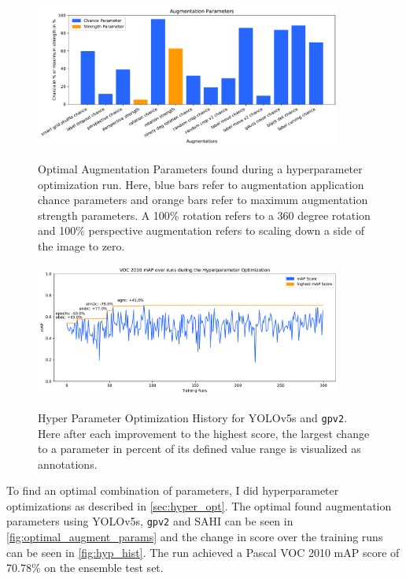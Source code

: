 \documentclass[10pt]{book}
\newcommand{\figureref}[1]{\autoref{#1}}
\begin{document}
\begin{figure}
  \caption{Optimal Augmentation Parameters found during a hyperparameter optimization run. Here, blue bars refer to augmentation application chance parameters and orange bars refer to maximum augmentation strength parameters. A 100\% rotation refers to a 360 degree rotation and 100\% perspective augmentation refers to scaling down a side of the image to zero.}
  \includegraphics[width=0.9\textwidth]{plot/best_hyp_run_params}
  \label{fig:optimal_augment_params} 
\end{figure} %

\begin{figure}
  \caption{Hyper Parameter Optimization History for \ac{YOLO}v5s and \texttt{gpv2}. Here after each improvement to the highest score, the largest change to a parameter in percent of its defined value range is visualized as annotations.}
  \includegraphics[width=0.9\textwidth]{image/hyp-param-search-yolov5s-sahi-rc-fix-history}
  \label{fig:hyp_hist}
\end{figure}


To find an optimal combination of parameters, I did hyperparameter optimizations as described in \autoref{sec:hyper_opt}. The optimal found augmentation parameters using \ac{YOLO}v5s, \texttt{gpv2} and \ac{SAHI} can be seen in \figureref{fig:optimal_augment_params} and the change in score over the training runs can be seen in \figureref{fig:hyp_hist}. 
The run achieved a Pascal VOC 2010 \ac{mAP} score of 70.78\% on the ensemble test set.
\end{document}
